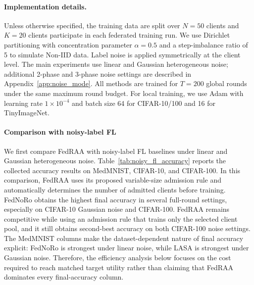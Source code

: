 \documentclass[conference]{IEEEtran}
\theoremstyle{definition}
\theoremstyle{remark}
\begin{document}
\paragraph{Implementation details.}
Unless otherwise specified, the training data are split over $N=50$ clients and $K=20$ clients participate in each federated training run.
We use Dirichlet partitioning with concentration parameter $\alpha=0.5$ and a step-imbalance ratio of 5 to simulate Non-IID data.
Label noise is applied symmetrically at the client level.
The main experiments use linear and Gaussian heterogeneous noise; additional 2-phase and 3-phase noise settings are described in Appendix~\ref{app:noise_mode}.
All methods are trained for $T=200$ global rounds under the same maximum round budget.
For local training, we use Adam with learning rate $1\times10^{-4}$ and batch size 64 for CIFAR-10/100 and 16 for TinyImageNet.
\paragraph{Comparison with noisy-label FL}
\label{para:comp_nfl}
We first compare FedRAA with noisy-label FL baselines under linear and Gaussian heterogeneous noise.
Table~\ref{tab:noisy_fl_accuracy} reports the collected accuracy results on MedMNIST, CIFAR-10, and CIFAR-100.
In this comparison, FedRAA uses its proposed variable-size admission rule and automatically determines the number of admitted clients before training.
FedNoRo obtains the highest final accuracy in several full-round settings, especially on CIFAR-10 Gaussian noise and CIFAR-100.
FedRAA remains competitive while using an admission rule that trains only the selected client pool, and it still obtains second-best accuracy on both CIFAR-100 noise settings.
The MedMNIST columns make the dataset-dependent nature of final accuracy explicit: FedNoRo is strongest under linear noise, while LASA is strongest under Gaussian noise.
Therefore, the efficiency analysis below focuses on the cost required to reach matched target utility rather than claiming that FedRAA dominates every final-accuracy column.
\end{document}
